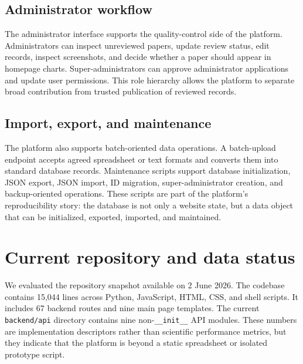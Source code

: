 \documentclass[11pt,a4paper]{article}
\begin{document}
\subsection{Administrator workflow}

The administrator interface supports the quality-control side of the platform. Administrators can inspect unreviewed papers, update review status, edit records, inspect screenshots, and decide whether a paper should appear in homepage charts. Super-administrators can approve administrator applications and update user permissions. This role hierarchy allows the platform to separate broad contribution from trusted publication of reviewed records.

\subsection{Import, export, and maintenance}

The platform also supports batch-oriented data operations. A batch-upload endpoint accepts agreed spreadsheet or text formats and converts them into standard database records. Maintenance scripts support database initialization, JSON export, JSON import, ID migration, super-administrator creation, and backup-oriented operations. These scripts are part of the platform's reproducibility story: the database is not only a website state, but a data object that can be initialized, exported, imported, and maintained.

\section{Current repository and data status}

We evaluated the repository snapshot available on 2 June 2026. The codebase contains 15,044 lines across Python, JavaScript, HTML, CSS, and shell scripts. It includes 67 backend routes and nine main page templates. The current \texttt{backend/api} directory contains nine non-\texttt{\_\_init\_\_} API modules. These numbers are implementation descriptors rather than scientific performance metrics, but they indicate that the platform is beyond a static spreadsheet or isolated prototype script.
\end{document}
